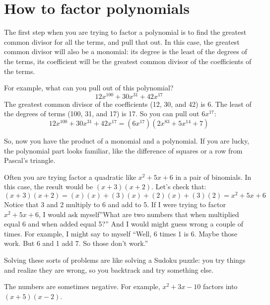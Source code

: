 \section{How to factor polynomials}

The first step when you are trying to factor a polynomial is to find
the greatest common divisor for all the terms, and pull that out. In
this case, the greatest common divisor will also be a monomial: its
degree is the least of the degrees of the terms, its coefficient will
be the greatest common divisor of the coefficients of the terms.

For example, what can you pull out of this polynomial?
\begin{equation*}
12x^100 + 30x^31 + 42x^17
\end{equation*}
The greatest common divisor of the coefficients (12, 30, and 42) is 6.  The least of the degrees of terms (100, 31, and 17) is 17.  So you can pull out $6x^17$:
\begin{equation*}
12x^100 + 30x^31 + 42x^17 = (6x^17)(2x^83 + 5x^14 + 7)
\end{equation*}

\begin{Exercise}[title={Factoring out the GCD monomial}, label=gcdmonomial]
  
\end{Exercise}
\begin{Answer}[ref=gcdmonomial]
  
\end{Answer}

So, now you have the product of a monomial and a polynomial. If you
are lucky, the polynomial part looks familiar, like the difference of
squares or a row from Pascal's triangle.

Often you are trying factor a quadratic like $x^2 + 5x + 6$ in a pair
of binomials. In this case, the result would be $(x + 3)(x + 2)$. Let's check that:
\begin{equation*}
  (x + 3)(x + 2) = (x)(x) + (3)(x) + (2)(x) + (3)(2) = x^2 + 5x + 6
\end{equation*}
Notice that 3 and 2 multiply to 6 and add to 5. If I were trying to
factor $x^2 + 5x + 6$, I would ask myself''What are two numbers that
when multiplied equal 6 and when added equal 5?'' And I would might
guess wrong a couple of times. For example, I might say to myself
``Well, 6 times 1 is 6. Maybe those work. But 6 and 1 add 7. So those
don't work.''

Solving these sorts of problems are like solving a Sudoku puzzle: you
try things and realize they are wrong, so you backtrack and try
something else.

The numbers are sometimes negative. For example, $x^2 + 3x - 10$ factors into $(x + 5)(x - 2)$.

\begin{Exercise}[title={Factoring quadratics}, label=factorquadratics]
  
\end{Exercise}
\begin{Answer}[ref=factorquadratics]
  
\end{Answer}
